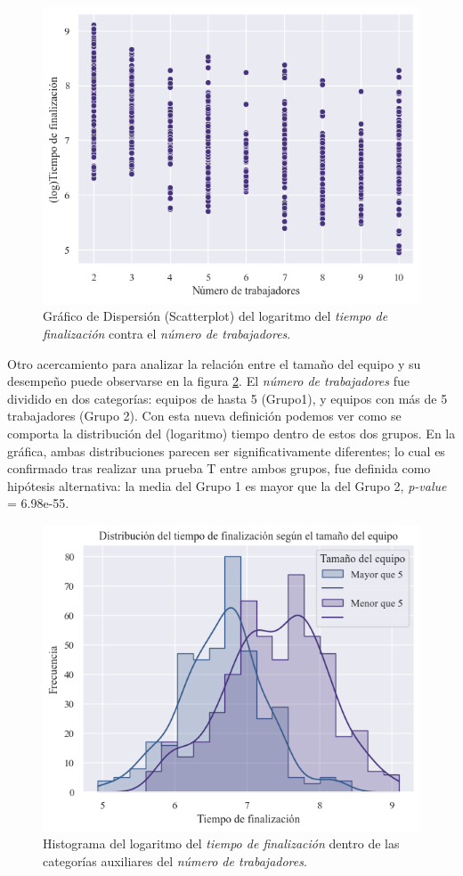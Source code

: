 \documentclass[a4paper, 12pt]{article}
\begin{document}
	\begin{figure}[htb!]
	\centering
	\includegraphics[height = .50\linewidth, width=.50\linewidth]{assets/log_time_wnumber_scatter}
	\caption{Gráfico de Dispersión (Scatterplot) del logaritmo del  \emph{tiempo de finalización} contra el \emph{número de trabajadores}.}
	\label{fig:3}
	\end{figure}
	
	Otro acercamiento para analizar la relación entre el tamaño del equipo y su desempeño puede observarse en la figura \ref{fig:4}. El \emph{número de trabajadores} fue dividido en dos categorías: equipos de hasta 5 (Grupo1), y equipos con más de 5 trabajadores (Grupo 2). Con esta nueva definición podemos ver como se comporta la distribución del (logaritmo) tiempo dentro de estos dos grupos. En la gráfica, ambas distribuciones parecen ser significativamente diferentes; lo cual es confirmado tras realizar una prueba T entre ambos grupos, fue definida como hipótesis alternativa: la media del Grupo 1 es mayor que la del Grupo 2, \emph{p-value} = 6.98e-55.
	
	\begin{figure}[htb!]
		\centering
		\includegraphics[height = .50\linewidth, width=.50\linewidth]{assets/log_time_wnumber_dist}
		\caption{Histograma del logaritmo del  \emph{tiempo de finalización} dentro de las categorías auxiliares del \emph{número de trabajadores}.}
		\label{fig:4}
	\end{figure}
	
\end{document}
